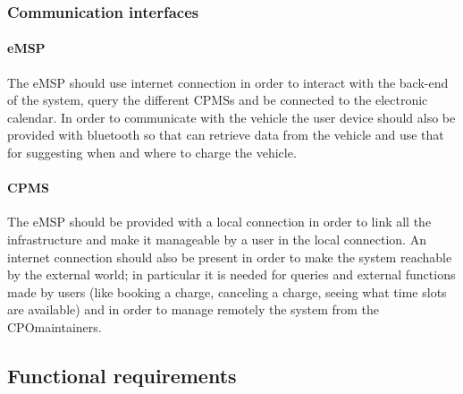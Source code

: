 \subsubsection{Communication interfaces}
\paragraph{\ac{eMSP}}
The \ac{eMSP} should use internet connection in order to interact with the back-end of the system, query the different \acp{CPMS} and be connected to the electronic calendar. In order to communicate with the vehicle the user device should also be provided with bluetooth so that can retrieve data from the vehicle and use that for suggesting when and where to charge the vehicle.

\paragraph{\ac{CPMS}}
The \ac{eMSP} should be provided with a local connection in order to link all the infrastructure and make it manageable by a user in the local connection.
An internet connection should also be present in order to make the system reachable by the external world; in particular it is needed for queries and external functions made by users (like booking a charge, canceling a charge, seeing what time slots are available) and in order to manage remotely the system from the \ac{CPO}maintainers.

\subsection{Functional requirements}


